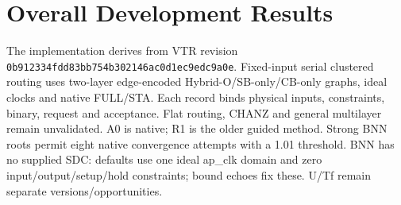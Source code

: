 \documentclass[conference,10pt]{IEEEtran}
\begin{document}
\section{Overall Development Results}
The implementation derives from VTR revision \texttt{0b912334fdd83bb754b302146ac0d1ec9edc9a0e}. Fixed-input serial clustered routing uses two-layer edge-encoded Hybrid-O/SB-only/CB-only graphs, ideal clocks and native FULL/STA. Each record binds physical inputs, constraints, binary, request and acceptance. Flat routing, CHANZ and general multilayer remain unvalidated. A0 is native; R1 is the older guided method. Strong BNN roots permit eight native convergence attempts with a 1.01 threshold. BNN has no supplied SDC: defaults use one ideal ap\_clk domain and zero input/output/setup/hold constraints; bound echoes fix these. U/Tf remain separate versions/opportunities.
\end{document}
